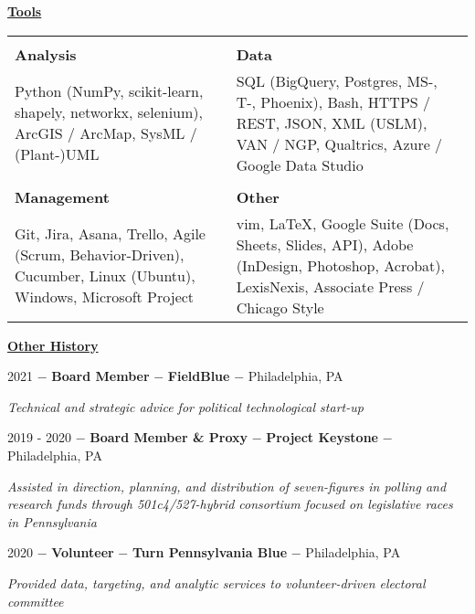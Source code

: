\documentclass[8pt]{article}
\begin{document}
\begin{center}
	\textbf{\underline{\Large{Tools}}} \\
	\begin{tabular}{ p{8cm} p{8cm} }
		 & \\
		\textbf{Analysis} & \textbf{Data} \\
		Python (NumPy, scikit-learn, shapely, networkx, selenium), ArcGIS / ArcMap, SysML / (Plant-)UML & SQL (BigQuery, Postgres, MS-, T-, Phoenix), Bash, HTTPS / REST, JSON,  XML (USLM),  VAN / NGP, Qualtrics, Azure / Google Data Studio \\
		 & \\
		\textbf{Management} & \textbf{Other} \\
		Git, Jira, Asana, Trello, Agile (Scrum, Behavior-Driven), Cucumber, Linux (Ubuntu), Windows, Microsoft Project & vim, \LaTeX, Google Suite (Docs, Sheets, Slides, API), Adobe (InDesign, Photoshop, Acrobat), LexisNexis, Associate Press / Chicago Style \\
	\end{tabular}
\end{center}

\begin{center}
	\textbf{\underline{\Large{Other History}}}
\end{center}

2021 $-$ \textbf{Board Member} $-$ \textbf{FieldBlue} $-$ Philadelphia, PA
\begin{adjustwidth}{1cm}{1cm}
	\textit{Technical and strategic advice for political technological start-up}\\
\end{adjustwidth}


2019 - 2020  $-$ \textbf{Board Member \& Proxy} $-$ \textbf{Project Keystone} $-$  Philadelphia, PA
\begin{adjustwidth}{1cm}{1cm}
	\textit{Assisted in direction, planning, and distribution of seven-figures in polling and research funds through 501c4/527-hybrid consortium focused on legislative races in Pennsylvania}\\
\end{adjustwidth}

2020 $-$ \textbf{Volunteer} $-$ \textbf{Turn Pennsylvania Blue} $-$ Philadelphia, PA
\begin{adjustwidth}{1cm}{1cm}
	\textit{Provided data, targeting, and analytic services to volunteer-driven electoral committee}\\
\end{adjustwidth}
\end{document}
